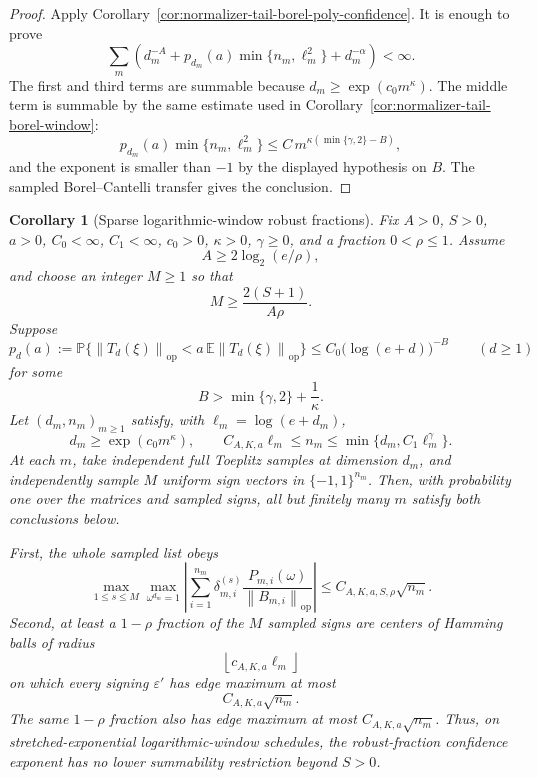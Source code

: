 \documentclass[11pt]{amsart}
\numberwithin{equation}{section}
\newtheorem{corollary}[theorem]{Corollary}
\theoremstyle{definition}
\theoremstyle{remark}
\newcommand{\op}{\mathrm{op}}
\newcommand{\Prob}{\mathbb P}
\newcommand{\Exp}{\mathbb E}
\newcommand{\norm}[1]{\left\lVert #1\right\rVert}
\newcommand{\eps}{\varepsilon}
\begin{document}
\begin{proof}
Apply Corollary~\ref{cor:normalizer-tail-borel-poly-confidence}.  It is enough
to prove
\[
  \sum_m\left(d_m^{-A}
  +p_{d_m}(a)\min\{n_m,\ell_m^2\}
  +d_m^{-\alpha}\right)<\infty .
\]
The first and third terms are summable because
\(d_m\ge\exp(c_0m^\kappa)\).  The middle term is summable by the same estimate
used in Corollary~\ref{cor:normalizer-tail-borel-window}:
\[
  p_{d_m}(a)\min\{n_m,\ell_m^2\}
  \le C\,m^{\kappa(\min\{\gamma,2\}-B)},
\]
and the exponent is smaller than \(-1\) by the displayed hypothesis on \(B\).
The sampled Borel--Cantelli transfer gives the conclusion.
\end{proof}

\begin{corollary}[Sparse logarithmic-window robust fractions]
\label{cor:normalizer-tail-borel-window-fractions}
Fix \(A>0\), \(S>0\), \(a>0\), \(C_0<\infty\), \(C_1<\infty\),
\(c_0>0\), \(\kappa>0\), \(\gamma\ge0\), and a fraction \(0<\rho\le1\).
Assume
\[
  A\ge 2\log_2(e/\rho),
\]
and choose an integer \(M\ge1\) so that
\[
  M\ge \frac{2(S+1)}{A\rho}.
\]
Suppose
\[
  p_d(a):=\Prob\{\norm{T_d(\xi)}_{\op}<a\,\Exp\norm{T_d(\xi)}_{\op}\}
  \le C_0\bigl(\log(e+d)\bigr)^{-B}
  \qquad(d\ge1)
\]
for some
\[
  B>\min\{\gamma,2\}+\frac1\kappa .
\]
Let \((d_m,n_m)_{m\ge1}\) satisfy, with \(\ell_m=\log(e+d_m)\),
\[
  d_m\ge\exp(c_0m^\kappa),\qquad
  C_{A,K,a}\ell_m\le n_m\le \min\{d_m,C_1\ell_m^\gamma\}.
\]
At each \(m\), take independent full Toeplitz samples at dimension \(d_m\), and
independently sample \(M\) uniform sign vectors in \(\{-1,1\}^{n_m}\).
Then, with probability one over the matrices and sampled signs, all but
finitely many \(m\) satisfy both conclusions below.

First, the whole sampled list obeys
\[
  \max_{1\le s\le M}\max_{\omega^{d_m}=1}
  \left|\sum_{i=1}^{n_m}\delta_{m,i}^{(s)}
  \frac{P_{m,i}(\omega)}{\norm{B_{m,i}}_{\op}}\right|
  \le C_{A,K,a,S,\rho}\sqrt{n_m}.
\]
Second, at least a \(1-\rho\) fraction of the \(M\) sampled signs are centers of
Hamming balls of radius
\[
  \left\lfloor c_{A,K,a}\ell_m\right\rfloor
\]
on which every signing \(\eps'\) has edge maximum at most
\[
  C_{A,K,a}\sqrt{n_m}.
\]
The same \(1-\rho\) fraction also has edge maximum at most
\(C_{A,K,a}\sqrt{n_m}\).  Thus, on stretched-exponential logarithmic-window
schedules, the robust-fraction confidence exponent has no lower summability
restriction beyond \(S>0\).
\end{corollary}
\end{document}
